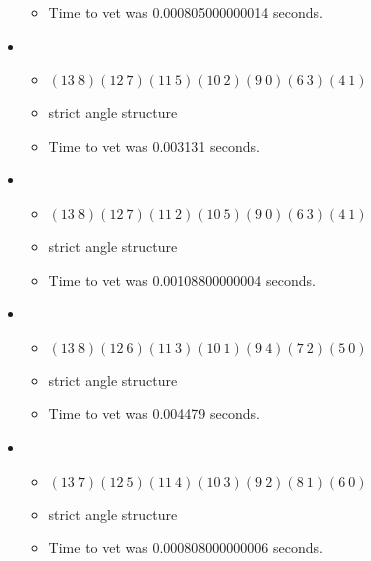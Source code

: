 \documentclass{article}
\begin{document}
\begin{itemize}
\begin{itemize}
      \item Time to vet was 0.000805000000014 seconds.
\end{itemize}
\item \begin{itemize}
      \item $(13\ 8)(12\ 7)(11\ 5)(10\ 2)(9\ 0)(6\ 3)(4\ 1)$
      \item strict angle structure
      \item Time to vet was 0.003131 seconds.
\end{itemize}
\item \begin{itemize}
      \item $(13\ 8)(12\ 7)(11\ 2)(10\ 5)(9\ 0)(6\ 3)(4\ 1)$
      \item strict angle structure
      \item Time to vet was 0.00108800000004 seconds.
\end{itemize}
\item \begin{itemize}
      \item $(13\ 8)(12\ 6)(11\ 3)(10\ 1)(9\ 4)(7\ 2)(5\ 0)$
      \item strict angle structure
      \item Time to vet was 0.004479 seconds.
\end{itemize}
\item \begin{itemize}
      \item $(13\ 7)(12\ 5)(11\ 4)(10\ 3)(9\ 2)(8\ 1)(6\ 0)$
      \item strict angle structure
      \item Time to vet was 0.000808000000006 seconds.
\end{itemize}
\end{itemize}
\end{document}
